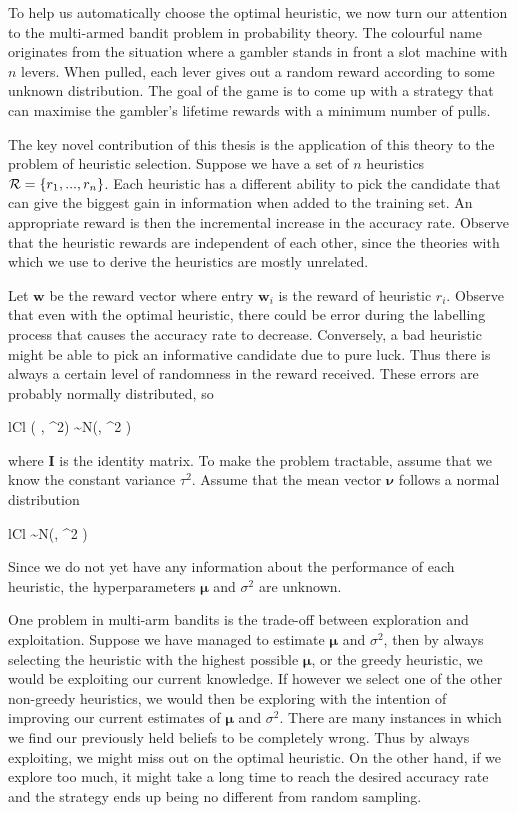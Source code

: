 To help us automatically choose the optimal heuristic, 
we now turn our attention to the multi-armed bandit problem in probability theory. The colourful
name originates from the situation where a gambler stands in front a slot machine with $n$ levers.
When pulled, each lever gives out a random reward according to some unknown distribution.
The goal of the game is to come up with a strategy that can maximise the gambler's
lifetime rewards with a minimum number of pulls.

The key novel contribution of this thesis is the application of this theory to the problem of
heuristic selection. Suppose we have a set of $n$ heuristics $ \mathcal{R} = \{r_1, ..., r_n \}$. Each heuristic
has a different ability to pick the candidate that can give the biggest gain in information
when added to the training set. An appropriate reward is then the incremental increase
in the accuracy rate. Observe that the heuristic rewards are independent of each other,
since the theories with which we use to derive the heuristics are mostly unrelated.

Let $\bm{w}$ be the reward vector where entry $\bm{w}_i$ is the reward of heuristic $r_i$.
Observe that even with the optimal heuristic, there could be error during the labelling
process that causes the accuracy rate to decrease. Conversely, a bad heuristic might be
able to pick an informative candidate due to pure luck. Thus there is always a certain level
of randomness in the reward received. These errors are probably normally distributed, so
	\begin{IEEEeqnarray*}{lCl}
		( \mid \bm{\nu}, \tau^2) \sim N(\bm{\nu}, \tau^2 )
	\end{IEEEeqnarray*}
where $\bm{I}$ is the identity matrix.
To make the problem tractable, assume that we know the constant variance $\tau^2$. Assume that
the mean vector $\bm{\nu}$ follows a normal distribution
	\begin{IEEEeqnarray*}{lCl}
		\bm{\nu} \sim N(\bm{\mu}, \sigma^2 )
	\end{IEEEeqnarray*}
Since we do not yet have any information about the performance of each heuristic,
the hyperparameters $\bm{\mu}$ and $\sigma^2$ are unknown.

One problem in multi-arm bandits is the trade-off between exploration and exploitation. Suppose we
have managed to estimate $\bm{\mu}$ and $\sigma^2$, then by always selecting the heuristic with the
highest possible $\bm{\mu}$, or the greedy heuristic, we would be exploiting our current knowledge.
If however we select one of the other non-greedy heuristics, we would then be exploring with the
intention of improving our current estimates of $\bm{\mu}$ and $\sigma^2$. There are many instances
in which we find our previously held beliefs to be completely wrong. Thus by always exploiting, we
might miss out on the optimal heuristic. On the other hand, if we explore too much, it might take a
long time to reach the desired accuracy rate and the strategy ends up being no different from
random sampling. 

